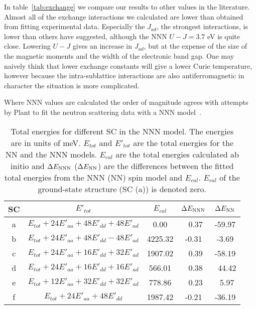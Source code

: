 \documentclass[aps,pre,reprint,superscriptaddress,longbibliography]{revtex4-1}
\begin{document}
{In table~\ref{tab:exchange} we compare our results to other values in the literature. Almost all of the exchange interactions we calculated are lower than obtained from fitting experimental data. Especially the $J_{ad}$, the strongest interactions, is lower than others have suggested, although the NNN $U-J = 3.7$ eV is quite close. Lowering $U-J$ gives an increase in $J_{ad}$, but at the expense of the size of the magnetic moments and the width of the electronic band gap. One may naively think that lower exchange constants will give a lower Curie temperature, however because the intra-sublattice interactions are also antiferromagnetic in character the situation is more complicated.

Where NNN values are calculated  the order of magnitude agrees with attempts by Plant to fit the neutron scattering data with a NNN model~\cite{Plant1983}.
\begingroup
\squeezetable 
\begin{table}[h]
\begin{ruledtabular}
        \caption{Total energies for different SC in the NNN model. The energies are in units of meV.  $E_{tot}$ and  $E'_{tot}$ are the total energies for the NN and the NNN models. $E_{cal}$ are the total energies calculated ab initio and $\Delta E_{\rm NNN}$ ($\Delta E_{\rm NN}$) are the differences between the fitted total energies from the NNN (NN) spin model and $E_{cal}$. $E_{cal}$ of the ground-state structure (SC (a)) is denoted zero.}
        \begin{center}
                \begin{tabular}{ccccc}
                        SC    & $E'_{tot}$   & $E_{cal}$    & $\Delta E_{\rm NNN}$   & $\Delta E_{\rm NN}$\\
                        \hline
                        a     & $E_{tot}+24E'_{aa}+48E'_{dd}+48E'_{ad}$   &    0.00 & \ 0.37 & -59.97\\
                        b     & $E_{tot}+24E'_{aa}+48E'_{dd}-48E'_{ad}$   & 4225.32 &  -0.31 &  -3.69\\
                        c     & $E_{tot}+24E'_{aa}+16E'_{dd}+32E'_{ad}$   & 1907.02 & \ 0.39 & -58.19\\
                        d     & $E_{tot}+24E'_{aa}+16E'_{dd}+16E'_{ad}$   &  566.01 & \ 0.38 &\ 44.42\\ 
                        e     & $E_{tot}+12E'_{aa}+32E'_{dd}+32E'_{ad}$   &  778.86 & \ 0.23 & \ 5.97\\ 
                        f     & $E_{tot}+24E'_{aa}+48E'_{dd}$          & 1987.42 &  -0.21 & -36.19\\ 

\end{tabular}
\end{center}
\end{ruledtabular}
\end{table}}
\end{document}
